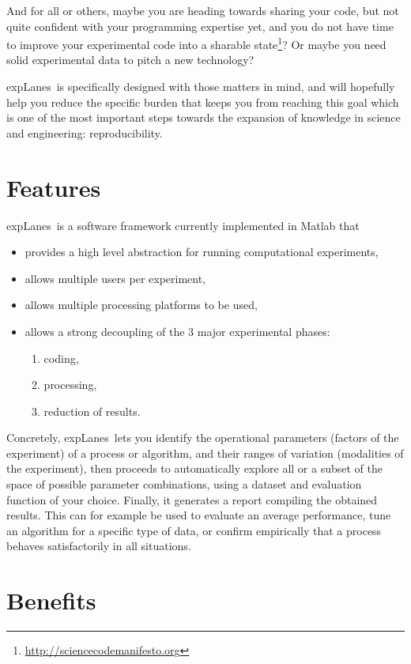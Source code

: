 \documentclass[a4paper,fleqn]{tufte-handout}
\newcommand{\explanes}{\textsf{expLanes}\ }
\begin{document}
And for all or others, maybe you are heading towards sharing your code, but not quite confident with your programming expertise yet, and you do not have time to improve your experimental code into a sharable state\footnote{\url{http://sciencecodemanifesto.org}}? Or maybe you need solid experimental data to pitch a new technology?

\explanes is specifically designed with those matters in mind, and will hopefully help you reduce the specific burden that keeps you from reaching this goal which is one of the most important steps towards the expansion of knowledge in science and engineering: reproducibility\cite{science, sp}.

\section{Features}
\hypertarget{Features}{} 

\explanes is a software framework currently implemented in Matlab that 
\begin{itemize}
\item provides a high level abstraction for running computational experiments,
\item allows multiple users per experiment,
\item allows multiple processing platforms to be used,
\item allows a strong decoupling of the 3 major experimental phases: 
\begin{enumerate}
\item coding,
\item processing,
\item reduction of results.
\end{enumerate}
\end{itemize}

Concretely, \explanes lets you identify the operational parameters (factors of the experiment) of a process or algorithm, and their ranges of variation (modalities of the experiment), then proceeds to automatically explore all or a subset of the space of possible parameter combinations, using a dataset and evaluation function of your choice. Finally, it generates a report compiling the obtained results. This can for example be used to evaluate an average performance, tune an algorithm for a specific type of data, or confirm empirically that a process behaves satisfactorily in all situations.

\section{Benefits} 
\hypertarget{benefits}{} 
\end{document}
